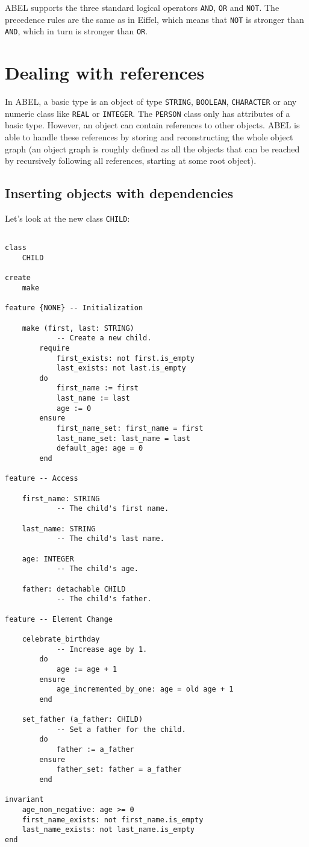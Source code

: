 \documentclass[a4paper,12pt]{report}
\begin{document}
ABEL supports the three standard logical operators \lstinline!AND!, \lstinline!OR! and \lstinline!NOT!. 
The precedence rules are the same as in Eiffel, which means that \lstinline!NOT! is stronger than \lstinline!AND!, which in turn is stronger than \lstinline!OR!.

\chapter{Dealing with references}
\label {chapter:references}

In ABEL, a basic type is an object of type \lstinline!STRING!, \lstinline!BOOLEAN!, \lstinline!CHARACTER! or any numeric class like \lstinline!REAL! or \lstinline!INTEGER!.
The \lstinline!PERSON! class only has attributes of a basic type. 
However, an object can contain references to other objects. ABEL is able to handle these references by storing and reconstructing the whole object graph 
(an object graph is roughly defined as all the objects that can be reached by recursively following all references, starting at some root object).

\section{Inserting objects with dependencies}
Let's look at the new class \lstinline!CHILD!:

\begin{lstlisting}[language=OOSC2Eiffel, captionpos=b, caption={The CHILD class.}, label={lst:child_class}]

class
	CHILD

create
	make

feature {NONE} -- Initialization

	make (first, last: STRING)
			-- Create a new child.
		require
			first_exists: not first.is_empty
			last_exists: not last.is_empty
		do
			first_name := first
			last_name := last
			age := 0
		ensure
			first_name_set: first_name = first
			last_name_set: last_name = last
			default_age: age = 0
		end

feature -- Access

	first_name: STRING
			-- The child's first name.

	last_name: STRING
			-- The child's last name.

	age: INTEGER
			-- The child's age.

	father: detachable CHILD
			-- The child's father.

feature -- Element Change

	celebrate_birthday
			-- Increase age by 1.
		do
			age := age + 1
		ensure
			age_incremented_by_one: age = old age + 1
		end

	set_father (a_father: CHILD)
			-- Set a father for the child.
		do
			father := a_father
		ensure
			father_set: father = a_father
		end

invariant
	age_non_negative: age >= 0
	first_name_exists: not first_name.is_empty
	last_name_exists: not last_name.is_empty
end


\end{lstlisting}
\end{document}

